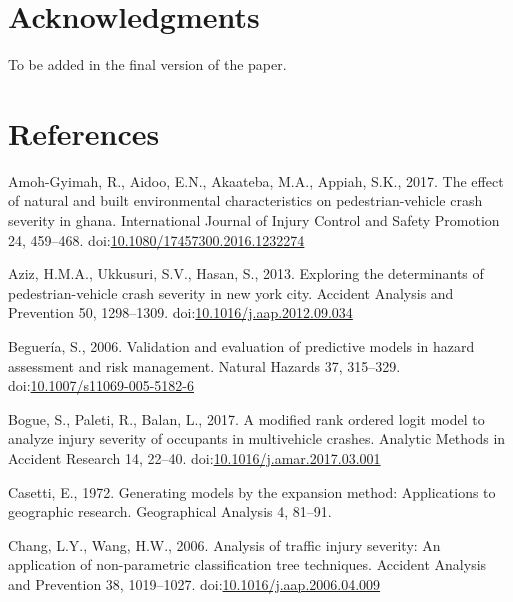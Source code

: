 \documentclass[]{elsarticle} %
\begin{document}
\hypertarget{acknowledgments}{%
\section*{Acknowledgments}\label{acknowledgments}}

To be added in the final version of the paper.

\hypertarget{references}{%
\section*{References}\label{references}}

\hypertarget{refs}{}
\leavevmode\hypertarget{ref-Amoh2017effect}{}%
Amoh-Gyimah, R., Aidoo, E.N., Akaateba, M.A., Appiah, S.K., 2017. The
effect of natural and built environmental characteristics on
pedestrian-vehicle crash severity in ghana. International Journal of
Injury Control and Safety Promotion 24, 459--468.
doi:\href{https://doi.org/10.1080/17457300.2016.1232274}{10.1080/17457300.2016.1232274}

\leavevmode\hypertarget{ref-Aziz2013exploring}{}%
Aziz, H.M.A., Ukkusuri, S.V., Hasan, S., 2013. Exploring the
determinants of pedestrian-vehicle crash severity in new york city.
Accident Analysis and Prevention 50, 1298--1309.
doi:\href{https://doi.org/10.1016/j.aap.2012.09.034}{10.1016/j.aap.2012.09.034}

\leavevmode\hypertarget{ref-Begueria2006validation}{}%
Beguería, S., 2006. Validation and evaluation of predictive models in
hazard assessment and risk management. Natural Hazards 37, 315--329.
doi:\href{https://doi.org/10.1007/s11069-005-5182-6}{10.1007/s11069-005-5182-6}

\leavevmode\hypertarget{ref-Bogue2017modified}{}%
Bogue, S., Paleti, R., Balan, L., 2017. A modified rank ordered logit
model to analyze injury severity of occupants in multivehicle crashes.
Analytic Methods in Accident Research 14, 22--40.
doi:\href{https://doi.org/10.1016/j.amar.2017.03.001}{10.1016/j.amar.2017.03.001}

\leavevmode\hypertarget{ref-Casetti1972generating}{}%
Casetti, E., 1972. Generating models by the expansion method:
Applications to geographic research. Geographical Analysis 4, 81--91.

\leavevmode\hypertarget{ref-Chang2006analysis}{}%
Chang, L.Y., Wang, H.W., 2006. Analysis of traffic injury severity: An
application of non-parametric classification tree techniques. Accident
Analysis and Prevention 38, 1019--1027.
doi:\href{https://doi.org/10.1016/j.aap.2006.04.009}{10.1016/j.aap.2006.04.009}
\end{document}
